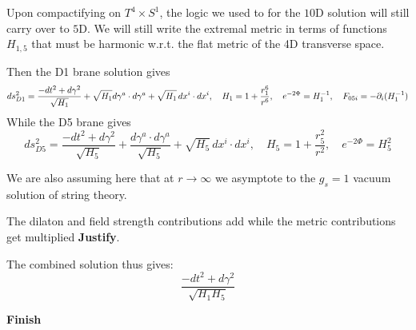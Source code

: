 \documentclass[11pt, class=article, crop=false]{standalone}
\begin{document}
\begin{enumerate}
	Upon compactifying on $T^4 \times S^1$, the logic we used to for the $10$D solution will still carry over to $5$D. We will still write the extremal metric in terms of functions $H_{1,5}$ that must be harmonic w.r.t. the flat metric of the 4D transverse space.
	
	Then the D1 brane solution gives
	\[
		ds^2_{D1}= \frac{-dt^2 + d\gamma^2}{\sqrt{H_1}} + \sqrt{H_1} d \gamma^a \cdot d \gamma^a + \sqrt{H_1}\, dx^i \cdot dx^i, \quad H_1 = 1 + \frac{r_1^6}{r^6}, \quad e^{-2\Phi} = H_1^{-1}, \quad F_{05i} = -\partial_i (H_1^{-1})
	\]
	While the D5 brane gives
	\[
		ds^2_{D5} = \frac{-dt^2 + d\gamma^2}{\sqrt{H_5}} + \frac{d \gamma^a \cdot d \gamma^a}{\sqrt{H_5}} + \sqrt{H_5} \, dx^i \cdot dx^i, \quad H_5 = 1 + \frac{r_5^2}{r^2}, \quad e^{-2\Phi} = H_5^2
	\]
	
	We are also assuming here that at $r \to \infty$ we asymptote to the $g_s= 1$ vacuum solution of string theory.
	
	
	The dilaton and field strength contributions add while the metric contributions get multiplied \textbf{Justify}.
	
	The combined solution thus gives:
	\[
		\frac{-dt^2 + d\gamma^2}{\sqrt{H_1 H_5}}
	\]
	 
	
	\textbf{Finish}
	
\end{enumerate}
\end{document}
